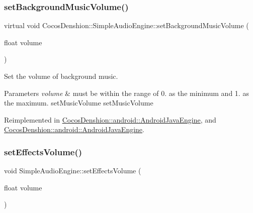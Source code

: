 \subsubsection{\texorpdfstring{set\+Background\+Music\+Volume()}{setBackgroundMusicVolume()}\hspace{0.1cm}{\footnotesize\ttfamily [2/2]}}
{\footnotesize\ttfamily virtual void Cocos\+Denshion\+::\+Simple\+Audio\+Engine\+::set\+Background\+Music\+Volume (\begin{DoxyParamCaption}\item[{float}]{volume }\end{DoxyParamCaption})\hspace{0.3cm}{\ttfamily [virtual]}}

Set the volume of background music.


\begin{DoxyParams}{Parameters}
{\em volume} & must be within the range of 0. as the minimum and 1. as the maximum.  set\+Music\+Volume  set\+Music\+Volume \\
\hline
\end{DoxyParams}


Reimplemented in \hyperlink{classCocosDenshion_1_1android_1_1AndroidJavaEngine_ac134271d2bfbc3bfa9b54eeb86f4f750}{Cocos\+Denshion\+::android\+::\+Android\+Java\+Engine}, and \hyperlink{classCocosDenshion_1_1android_1_1AndroidJavaEngine_a98d2ffd728746eacce6f4471c1bd68a7}{Cocos\+Denshion\+::android\+::\+Android\+Java\+Engine}.

\mbox{\label{classCocosDenshion_1_1SimpleAudioEngine_a792bcbbf7da23ef90e38aaee576914e7}} 
\subsubsection{\texorpdfstring{set\+Effects\+Volume()}{setEffectsVolume()}\hspace{0.1cm}{\footnotesize\ttfamily [1/2]}}
{\footnotesize\ttfamily void Simple\+Audio\+Engine\+::set\+Effects\+Volume (\begin{DoxyParamCaption}\item[{float}]{volume }\end{DoxyParamCaption})\hspace{0.3cm}{\ttfamily [virtual]}}

